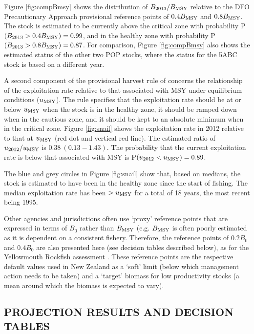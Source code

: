 Figure \ref{fig:compBmsy} shows the distribution of $B_{2013}/B_\mathrm{MSY}$ relative to the DFO Precautionary Approach provisional reference points of $0.4 B_\mathrm{MSY}$ and $0.8 B_\mathrm{MSY}$. The stock is estimated to be currently above the critical zone with probability P$(B_{2013} > 0.4 B_\mathrm{MSY}) = 0.99$, and in the healthy zone with probability P$(B_{2013} > 0.8 B_\mathrm{MSY}) = 0.87$. For comparison, Figure \ref{fig:compBmsy} also shows the estimated status of the other two POP stocks, where the status for the 5ABC stock is based on a different year.

A second component of the provisional harvest rule of concerns the relationship of the exploitation rate relative to that associated with MSY under equilibrium conditions ($u_\mathrm{MSY}$). The rule specifies that the exploitation rate should be at or below $u_\mathrm{MSY}$ when the stock is in the healthy zone, it should be ramped down when in the cautious zone, and it should be kept to an absolute minimum when in the critical zone. Figure \ref{fig:snail} shows the exploitation rate in 2012 relative to that at $u_\mathrm{MSY}$ (red dot and vertical red line). The estimated ratio of $u_{2012}/u_\mathrm{MSY}$ is $0.38~(0.13-1.43)$. The probability that the current exploitation rate is below that associated with MSY is P$(u_{2012} < u_\mathrm{MSY}) = 0.89$.


The blue and grey circles in Figure \ref{fig:snail} show that, based on medians, the stock is estimated to have been in the healthy zone since the start of fishing. The median exploitation rate has been $>u_\mathrm{MSY}$ for a total of 18 years, the most recent being 1995.  

Other agencies and jurisdictions often use `proxy' reference points that are expressed in terms of $B_0$ rather than $B_\mathrm{MSY}$ (e.g. $B_\mathrm{MSY}$ is often poorly estimated as it is dependent on a consistent fishery. Therefore, the reference points of $0.2 B_0$ and $0.4 B_0$ are also presented here (see decision tables described below), as for the Yellowmouth Rockfish assessment . These reference points are the respective default values used in New Zealand as a `soft' limit (below which management action needs to be taken) and a `target' biomass for low productivity stocks (a mean around which the biomass is expected to vary).

\subsection{PROJECTION RESULTS AND DECISION TABLES}

